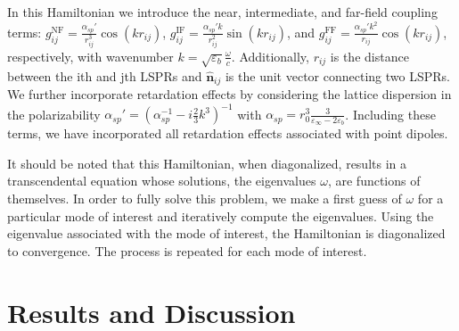 \documentclass[journal=ancac3,manuscript=article]{achemso}
\begin{document}
In this Hamiltonian we introduce the near, intermediate, and far-field coupling terms: $g_{ij}^{\textrm{NF}} = \frac{\alpha_{sp}'}{r_{ij}^3}\cos\left(k r_{ij}\right)$, $g_{ij}^{\textrm{IF}} = \frac{\alpha_{sp}'k}{r_{ij}^2}\sin\left(k r_{ij}\right)$, and $g_{ij}^{\textrm{FF}} = \frac{\alpha_{sp}'k^2}{r_{ij}}\cos\left(k r_{ij}\right)$, respectively, with wavenumber $k = \sqrt{\varepsilon_b}\frac{\omega}{c}$. Additionally, $r_{ij}$ is the distance between the ith and jth LSPRs and $\hat{\textbf{n}}_{ij}$ is the unit vector connecting two LSPRs. We further incorporate retardation effects by considering the lattice dispersion in the polarizability $\alpha_{sp}' = \left(\alpha_{sp}^{-1} - i\frac{2}{3}k^3\right)^{-1}$ with $\alpha_{sp} = r_0^3\frac{3}{\varepsilon_{\infty}-2\varepsilon_b}$. Including these terms, we have incorporated all retardation effects associated with point dipoles\cite{Purcell1973,Draine1993}.

It should be noted that this Hamiltonian, when diagonalized, results in a transcendental equation whose solutions, the eigenvalues $\omega$, are functions of themselves. In order to fully solve this problem, we make a first guess of $\omega$ for a particular mode of interest and iteratively compute the eigenvalues. Using the eigenvalue associated with the mode of interest, the Hamiltonian is diagonalized to convergence. The process is repeated for each mode of interest.

\section{Results and Discussion}
\end{document}
